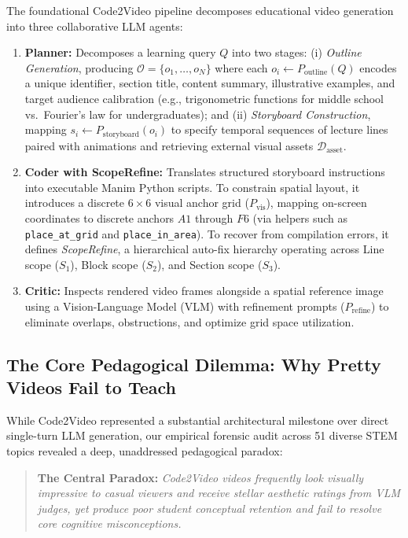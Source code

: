 \documentclass[11pt, a4paper]{article}
\begin{document}
The foundational Code2Video pipeline decomposes educational video generation into three collaborative LLM agents:
\begin{enumerate}[leftmargin=*]
    \item \textbf{Planner:} Decomposes a learning query $Q$ into two stages: (i) \textit{Outline Generation}, producing $\mathcal{O} = \{o_1, \dots, o_N\}$ where each $o_i \leftarrow P_{\text{outline}}(Q)$ encodes a unique identifier, section title, content summary, illustrative examples, and target audience calibration (e.g., trigonometric functions for middle school vs.\ Fourier's law for undergraduates); and (ii) \textit{Storyboard Construction}, mapping $s_i \leftarrow P_{\text{storyboard}}(o_i)$ to specify temporal sequences of lecture lines paired with animations and retrieving external visual assets $\mathcal{D}_{\text{asset}}$.
    \item \textbf{Coder with ScopeRefine:} Translates structured storyboard instructions into executable Manim Python scripts. To constrain spatial layout, it introduces a discrete $6 \times 6$ visual anchor grid ($P_{\text{vis}}$), mapping on-screen coordinates to discrete anchors $A1$ through $F6$ (via helpers such as \texttt{place\_at\_grid} and \texttt{place\_in\_area}). To recover from compilation errors, it defines \textit{ScopeRefine}, a hierarchical auto-fix hierarchy operating across Line scope ($S_1$), Block scope ($S_2$), and Section scope ($S_3$).
    \item \textbf{Critic:} Inspects rendered video frames alongside a spatial reference image using a Vision-Language Model (VLM) with refinement prompts ($P_{\text{refine}}$) to eliminate overlaps, obstructions, and optimize grid space utilization.
\end{enumerate}

\subsection{The Core Pedagogical Dilemma: Why Pretty Videos Fail to Teach}
While Code2Video represented a substantial architectural milestone over direct single-turn LLM generation, our empirical forensic audit across 51 diverse STEM topics revealed a deep, unaddressed pedagogical paradox:

\begin{quote}
\textbf{The Central Paradox:} \textit{Code2Video videos frequently look visually impressive to casual viewers and receive stellar aesthetic ratings from VLM judges, yet produce poor student conceptual retention and fail to resolve core cognitive misconceptions.}
\end{quote}
\end{document}
